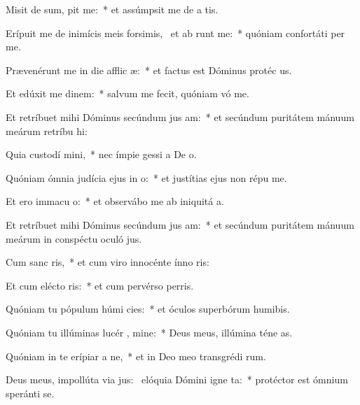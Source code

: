 \item Misit de sum,  pit me:~* et assúmpsit me de a tis.
\item Erípuit me de inimícis meis forsimis,~\pscross{} et ab   runt me:~* quóniam confortáti  per me.
\item Prævenérunt me in die afflic æ:~* et factus est Dóminus protéc us.
\item Et edúxit me  dinem:~* salvum me fecit, quóniam vó me.
\item Et retríbuet mihi Dóminus secúndum jus am:~* et secúndum puritátem mánuum meárum retríbu hi:
\item Quia custodí  mini,~* nec ímpie gessi a De o.
\item Quóniam ómnia judícia ejus in  o:~* et justítias ejus non répu  me.
\item Et ero immacu  o:~* et observábo me ab iniquitá a.
\item Et retríbuet mihi Dóminus secúndum jus am:~* et secúndum puritátem mánuum meárum in conspéctu oculó jus.
\item Cum sanc  ris,~* et cum viro innocénte ínno ris:
\item Et cum elécto  ris:~* et cum pervérso perris.
\item Quóniam tu pópulum húmi  cies:~* et óculos superbórum humibis.
\item Quóniam tu illúminas lucér , mine:~* Deus meus, illúmina téne as.
\item Quóniam in te erípiar a ne,~* et in Deo meo transgrédi rum.
\item Deus meus, impollúta via jus:~\pscross{} elóquia Dómini igne ta:~* protéctor est ómnium speránti  se.
